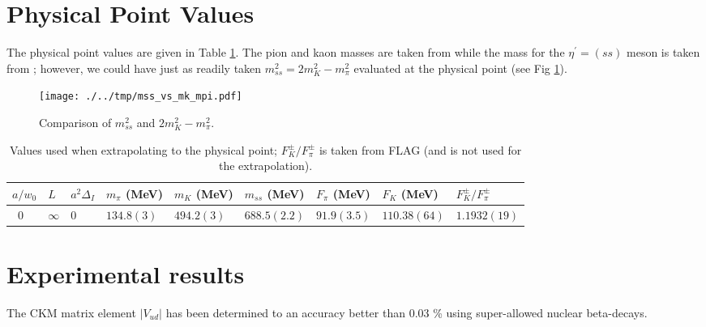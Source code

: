 \documentclass[prd,tightenlines,preprintnumbers,showpacs,superscriptaddress,notitlepage,eqsecnum,floatfix,notitlepage]{revtex4-1}
\begin{document}
\appendix
\section{Physical Point Values}
The physical point values are given in Table \ref{table:phys_point_values}. The pion and kaon masses are taken from \cite{Berkowitz:2017opd} while the mass for the $\eta^\prime = (ss)$ meson is taken from \cite{Dowdall:2013rya}; however, we could have just as readily taken $m_{ss}^2 = 2 m_K^2 - m_\pi^2$ evaluated at the physical point (see Fig \ref{fig:mss}).

\begin{figure}
	\texttt{[image: ./../tmp/mss\_vs\_mk\_mpi.pdf]}
	\caption{Comparison of $m_{ss}^2$ and $2m_K^2 - m_\pi^2$.}
	\label{fig:mss}
\end{figure}

\begin{table}[]
	\begin{ruledtabular}
		\begin{tabular}{lll||lll||lll}
		$a/w_0$ & $L$      & $a^2 \Delta_I$ & $m_\pi$ (MeV)   & $m_K$ (MeV)     & $m_{ss}$ (MeV)   & $F_\pi$ (MeV)   & $F_K$ (MeV)      & $F_K^\pm/F_\pi^\pm$ \\
		\hline\
		0       & $\infty$ & 0              & $134.8(3)$ & $494.2(3)$& $688.5(2.2)$ & $91.9(3.5)$ & $110.38(64)$ & $1.1932(19)$       \\
		\end{tabular}
	\end{ruledtabular}
\caption{Values used when extrapolating to the physical point; $F_K^\pm/F_\pi^\pm$ is taken from FLAG (and is not used for the extrapolation).}
\label{table:phys_point_values}
\end{table}

\section{Experimental results}
The CKM matrix element $|V_{ud}|$ has been determined to an accuracy better than 0.03 \% using super-allowed nuclear beta-decays. 



\end{document}
